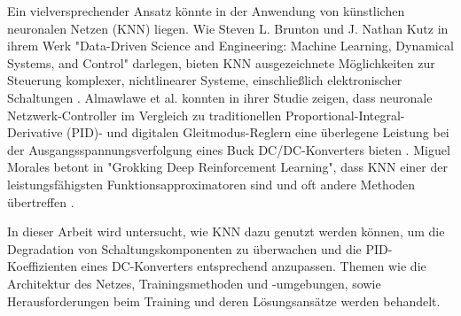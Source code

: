 Ein vielversprechender Ansatz könnte in der Anwendung von künstlichen neuronalen Netzen (KNN) liegen. Wie Steven L. Brunton und J. Nathan Kutz in ihrem Werk "Data-Driven Science and Engineering: Machine Learning, Dynamical Systems, and Control" darlegen, bieten KNN ausgezeichnete Möglichkeiten zur Steuerung komplexer, nichtlinearer Systeme, einschließlich elektronischer Schaltungen \cite[p.~270]{brunton2019data}. Almawlawe et al. konnten in ihrer Studie zeigen, dass neuronale Netzwerk-Controller im Vergleich zu traditionellen Proportional-Integral-Derivative (PID)- und digitalen Gleitmodus-Reglern eine überlegene Leistung bei der Ausgangsspannungsverfolgung eines Buck DC/DC-Konverters bieten \cite[p.~8]{Almawlawe2023}. Miguel Morales betont in "Grokking Deep Reinforcement Learning", dass KNN einer der leistungsfähigsten Funktionsapproximatoren sind und oft andere Methoden übertreffen \cite[p.~22]{morales2020grokking}.

In dieser Arbeit wird untersucht, wie KNN dazu genutzt werden können, um die Degradation von Schaltungskomponenten zu überwachen und die PID-Koeffizienten eines DC-Konverters entsprechend anzupassen. Themen wie die Architektur des Netzes, Trainingsmethoden und -umgebungen, sowie Herausforderungen beim Training und deren Lösungsansätze werden behandelt.
